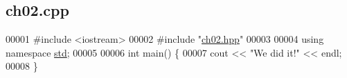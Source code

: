 \hypertarget{ch02_8cpp_source}{}\subsection{ch02.\+cpp}

\begin{DoxyCode}
00001 \textcolor{preprocessor}{#include <iostream>}
00002 \textcolor{preprocessor}{#include "\hyperlink{ch02_8hpp}{ch02.hpp}"}
00003 
00004 \textcolor{keyword}{using namespace }\hyperlink{namespacestd}{std};
00005 
00006 \textcolor{keywordtype}{int} main() \{
00007   cout << \textcolor{stringliteral}{"We did it!"} << endl;
00008 \}
\end{DoxyCode}
